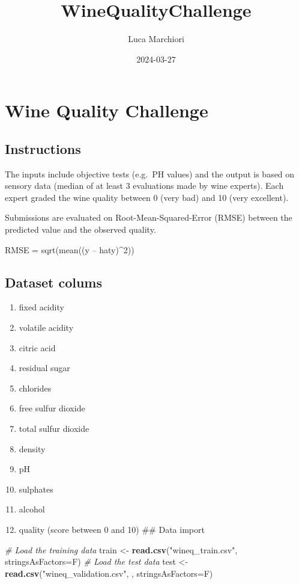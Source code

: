 \documentclass[
]{article}
\title{WineQualityChallenge}
\author{Luca Marchiori}
\date{2024-03-27}
\newenvironment{Shaded}{\begin{snugshade}}{\end{snugshade}}
\newcommand{\AttributeTok}[1]{\textcolor[rgb]{0.13,0.29,0.53}{#1}}
\newcommand{\CommentTok}[1]{\textcolor[rgb]{0.56,0.35,0.01}{\textit{#1}}}
\newcommand{\FunctionTok}[1]{\textcolor[rgb]{0.13,0.29,0.53}{\textbf{#1}}}
\newcommand{\NormalTok}[1]{#1}
\newcommand{\OtherTok}[1]{\textcolor[rgb]{0.56,0.35,0.01}{#1}}
\newcommand{\StringTok}[1]{\textcolor[rgb]{0.31,0.60,0.02}{#1}}
\providecommand{\tightlist}{%
  \setlength{\itemsep}{0pt}\setlength{\parskip}{0pt}}
\begin{document}
\maketitle

\hypertarget{wine-quality-challenge}{%
\section{Wine Quality Challenge}\label{wine-quality-challenge}}

\hypertarget{instructions}{%
\subsection{Instructions}\label{instructions}}

The inputs include objective tests (e.g.~PH values) and the output is
based on sensory data (median of at least 3 evaluations made by wine
experts). Each expert graded the wine quality between 0 (very bad) and
10 (very excellent).

Submissions are evaluated on Root-Mean-Squared-Error (RMSE) between the
predicted value and the observed quality.

RMSE = sqrt(mean((y -- haty)\^{}2))

\hypertarget{dataset-colums}{%
\subsection{Dataset colums}\label{dataset-colums}}

\begin{enumerate}
\def\labelenumi{\arabic{enumi}.}
\tightlist
\item
  fixed acidity
\item
  volatile acidity
\item
  citric acid
\item
  residual sugar
\item
  chlorides
\item
  free sulfur dioxide
\item
  total sulfur dioxide
\item
  density
\item
  pH
\item
  sulphates
\item
  alcohol
\item
  quality (score between 0 and 10) \#\# Data import
\end{enumerate}

\begin{Shaded}
\begin{Highlighting}[]
\CommentTok{\# Load the training data}
\NormalTok{train }\OtherTok{\textless{}{-}} \FunctionTok{read.csv}\NormalTok{(}\StringTok{"wineq\_train.csv"}\NormalTok{, }\AttributeTok{stringsAsFactors=}\NormalTok{F)}
\CommentTok{\# Load the test data}
\NormalTok{test }\OtherTok{\textless{}{-}} \FunctionTok{read.csv}\NormalTok{(}\StringTok{"wineq\_validation.csv"}\NormalTok{, , }\AttributeTok{stringsAsFactors=}\NormalTok{F)}
\end{Highlighting}
\end{Shaded}
\end{document}

